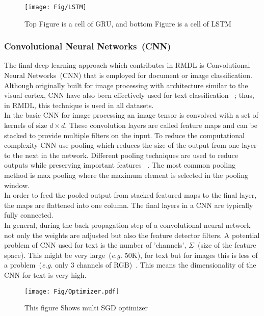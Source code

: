 \documentclass[sigconf, final]{acmart}
\begin{document}
\begin{figure}[b]
\vspace{-0.15in}
\centering
\texttt{[image: Fig/LSTM]}
\vspace{-0.15in}
\caption{Top Figure is a cell of GRU, and bottom Figure is a cell of LSTM}\label{fig:LSTM}

\end{figure}



\subsubsection{Convolutional Neural Networks~(CNN)}\label{subsubsec:CNN}

The final deep learning approach which contributes in RMDL is  Convolutional Neural Networks~(CNN) that is employed for  document or image classification. Although originally built for image processing with architecture similar to the visual cortex, CNN have also been effectively used for  text classification ~\cite{lecun1998gradient}; thus, in RMDL, this technique is used in all datasets. \\ In the basic CNN for image processing an image tensor is convolved with a set of kernels of size $d \times d$. These convolution layers are called feature maps and can be stacked to provide multiple filters on the input. To reduce the computational complexity CNN use pooling which reduces the size of the output from one layer to the next in the network. Different pooling techniques are used to reduce outputs while preserving important features ~\cite{scherer2010evaluation}. The most common pooling method is max pooling where the maximum element is selected in the pooling window.\\ In order to feed the pooled output from stacked featured maps to the final layer, the maps are flattened into one column. The final layers in a CNN are typically fully connected.\\
In general, during the back propagation step of a convolutional neural network not only the weights are adjusted but also the feature detector filters. A potential problem of CNN used for text is the number of 'channels', $\Sigma$~(size of the feature space). This might be very large~(\textit{e.g.} 50K), for text but for images this is less of a problem~(\textit{e.g.} only 3 channels of RGB)~\cite{johnson2014effective}. This means the dimensionality of the CNN for text is very high.

\begin{figure}[t]
\centering

\texttt{[image: Fig/Optimizer.pdf]}
\caption{This figure Shows multi SGD optimizer }\label{Optimizer}
\vspace{-0.15in}
\end{figure}
\end{document}
